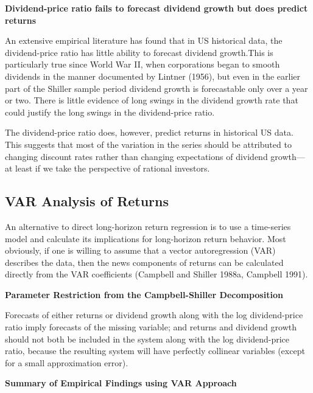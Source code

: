 \documentclass[
]{book}
\begin{document}
\textbf{Dividend-price ratio fails to forecast dividend growth but does predict returns}

An extensive empirical literature has found that in US historical data, the dividend-price ratio has little ability to forecast dividend growth.This is particularly true since World War II, when corporations began to smooth dividends in the manner documented by Lintner (1956), but even in the earlier part of the Shiller sample period dividend growth is forecastable only over a year or two. There is little evidence of long swings in the dividend growth rate that could justify the long swings in the dividend-price ratio.

The dividend-price ratio does, however, predict returns in historical US data. This suggests that most of the variation in the series should be attributed to changing discount rates rather than changing expectations of dividend growth---at least if we take the perspective of rational investors.

\hypertarget{var-analysis-of-returns}{%
\subsection{VAR Analysis of Returns}\label{var-analysis-of-returns}}

An alternative to direct long-horizon return regression is to use a time-series model and calculate its implications for long-horizon return behavior. Most obviously, if one is willing to assume that a vector autoregression (VAR) describes the data, then the news components of returns can be calculated directly from the VAR coefficients (Campbell and Shiller 1988a, Campbell 1991).

\textbf{Parameter Restriction from the Campbell-Shiller Decomposition}

Forecasts of either returns or dividend growth along with the log dividend-price ratio imply forecasts of the missing variable; and returns and dividend growth should not both be included in the system along with the log dividend-price ratio, because the resulting system will have perfectly collinear variables (except for a small approximation error).

\textbf{Summary of Empirical Findings using VAR Approach}
\end{document}
